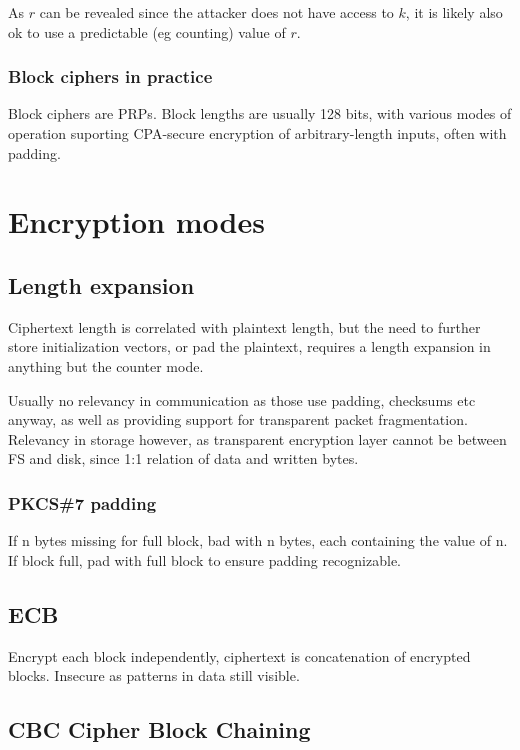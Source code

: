 \documentclass[a4paper]{scrreprt}
\begin{document}
As $r$ can be revealed since the attacker does not have access to $k$, it is
likely also ok to use a predictable (eg counting) value of $r$.

\subsection{Block ciphers in practice}

Block ciphers are PRPs. Block lengths are usually 128 bits, with various modes
of operation suporting CPA-secure encryption of arbitrary-length inputs, often
with padding.


\chapter{Encryption modes}

\section{Length expansion}

Ciphertext length is correlated with plaintext length, but the need to further
store initialization vectors, or pad the plaintext, requires a length expansion
in anything but the counter mode.

Usually no relevancy in communication as those use padding, checksums etc
anyway, as well as providing support for transparent packet fragmentation.
Relevancy in storage however, as transparent encryption layer cannot be between
FS and disk, since 1:1 relation of data and written bytes.

\subsection{PKCS\#7 padding}

If n bytes missing for full block, bad with n bytes, each containing the value
of n. If block full, pad with full block to ensure padding recognizable.

\section{ECB}

Encrypt each block independently, ciphertext is concatenation of encrypted
blocks. Insecure as patterns in data still visible.

\section{CBC Cipher Block Chaining}
\end{document}
